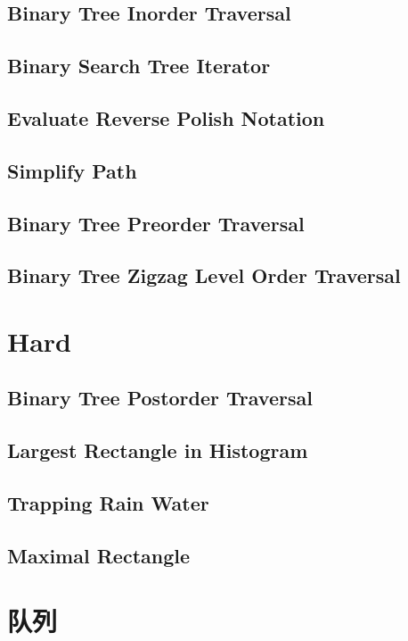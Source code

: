 \documentclass[11pt]{book}
\begin{document}
\subsection{Binary Tree Inorder Traversal}
\label{sec-5-3-1}
\subsection{Binary Search Tree Iterator}
\label{sec-5-3-2}
\subsection{Evaluate Reverse Polish Notation}
\label{sec-5-3-3}
\subsection{Simplify Path}
\label{sec-5-3-4}
\subsection{Binary Tree Preorder Traversal}
\label{sec-5-3-5}
\subsection{Binary Tree Zigzag Level Order Traversal}
\label{sec-5-3-6}
\section{Hard}
\label{sec-5-4}
\subsection{Binary Tree Postorder Traversal}
\label{sec-5-4-1}
\subsection{Largest Rectangle in Histogram}
\label{sec-5-4-2}
\subsection{Trapping Rain Water}
\label{sec-5-4-3}
\subsection{Maximal Rectangle}
\label{sec-5-4-4}
\section{队列}
\label{sec-5-5}
\subsection{}
\label{sec-5-5-1}
\end{document}
